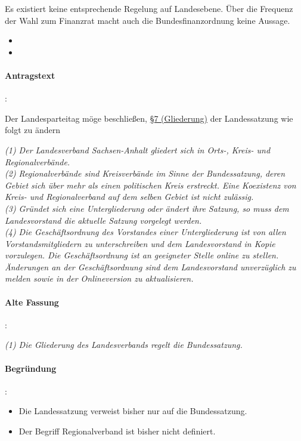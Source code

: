 Es existiert keine entsprechende Regelung auf Landesebene. Über die Frequenz der Wahl zum Finanzrat macht auch die Bundesfinanzordnung keine Aussage.


\label{satzung:gliederungen1}
\begin{itemize}
\item {}
\item {}
\end{itemize}

\paragraph{Antragstext}:

Der Landesparteitag möge beschließen, \href{http://wiki.piratenpartei.de/LSA:Satzung#.C2.A7_7_-_Gliederung}{§7 (Gliederung)} der Landessatzung wie folgt zu ändern

\textit{(1) Der Landesverband Sachsen-Anhalt gliedert sich in Orts-, Kreis- und Regionalverbände.\\
(2) Regionalverbände sind Kreisverbände im Sinne der Bundessatzung, deren Gebiet sich über mehr als einen politischen Kreis erstreckt. Eine Koexistenz von Kreis- und Regionalverband auf dem selben Gebiet ist nicht zulässig.\\
(3) Gründet sich eine Untergliederung oder ändert ihre Satzung, so muss dem Landesvorstand die aktuelle Satzung vorgelegt werden.\\
(4) Die Geschäftsordnung des Vorstandes einer Untergliederung ist von allen Vorstandsmitgliedern zu unterschreiben und dem Landesvorstand in Kopie vorzulegen. Die Geschäftsordnung ist an geeigneter Stelle online zu stellen. Änderungen an der Geschäftsordnung sind dem Landesvorstand unverzüglich zu melden sowie in der Onlineversion zu aktualisieren.}

\paragraph{Alte Fassung}:

\textit{(1) Die Gliederung des Landesverbands regelt die Bundessatzung.}

\paragraph{Begründung}:

\begin{itemize}
\item Die Landessatzung verweist bisher nur auf die Bundessatzung.
\item Der Begriff Regionalverband ist bisher nicht definiert.
\end{itemize}

